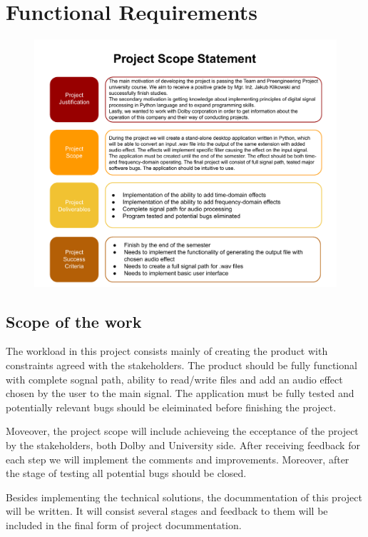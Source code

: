 \documentclass[12pt]{article}
\begin{document}
\section{Functional Requirements}

\begin{figure}[H]
		\includegraphics[width=1.2\textwidth, center]{Project scope statement}
\end{figure}

\subsection{Scope of the work}

	The workload in this project consists mainly of creating the product with constraints agreed with the stakeholders. The product should be fully functional with complete sognal path, ability to read/write files and add an audio effect chosen by the user to the main signal. The application must be fully tested and potentially relevant bugs should be eleiminated before finishing the project.
	
	Moveover, the project scope will include achieveing the ecceptance of the project by the stakeholders, both Dolby and University side. After receiving feedback for each step we will implement the comments and improvements. Moreover, after the stage of testing all potential bugs should be closed.
	
	Besides implementing the technical solutions, the docummentation of this project will be written. It will consist several stages and feedback to them will be included in the final form of project docummentation.
	
\end{document}
